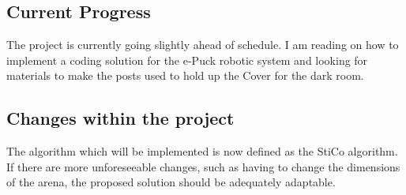 \subsection{Current Progress}
The project is currently going slightly ahead of schedule.  I am 
reading on how to implement a coding solution for the e-Puck robotic system and
looking for materials to make the posts used to hold up the Cover for the dark 
room.  

\subsection{Changes within the project}
The algorithm which will be implemented is now defined as the StiCo algorithm.
If there are more unforeseeable changes, such as having to change the dimensions
of the arena, the proposed solution should be adequately adaptable.  
